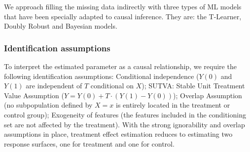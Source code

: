 \documentclass[12pt, a4paper]{article}
\begin{document}
We approach filling the missing data indirectly with three types of ML models
that have been specially adapted to causal inference. They are: the T-Learner,
Doubly Robust and Bayesian models. 

\subsubsection*{Identification assumptions}

To interpret the estimated parameter as a causal relationship, we require the following identification assumptions:
Conditional independence ($Y(0)$ and $Y(1)$ are independent of $T$ conditional on $X$); SUTVA: Stable Unit Treatment Value Assumption ($Y = Y(0) + T \cdot (Y(1) - Y(0))$); Overlap Assumption (no subpopulation defined by $X = x$ is entirely located in the treatment or control group); Exogeneity of features (the features included in the conditioning set are not affected by the treatment). With the strong ignorability and overlap assumptions in place, treatment effect estimation reduces to estimating two response surfaces, one for treatment and one for control.



\end{document}
